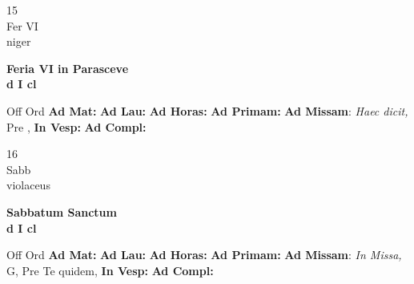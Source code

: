 \documentclass[10pt, openany]{book}
\begin{document}
        \begin{center}
            \begin{minipage}{3.5in}
                \vspace{2em}
                \begin{minipage}{0.5in}
                    {\Huge 15} \\
                    {\normalsize Fer VI} \\
                    {\normalsize niger}
                \end{minipage}
                \begin{minipage}{3.0in}
                    \textbf{ \large Feria VI in Parasceve \\
                    \textnormal{\normalsize d I cl}} \\ 
                \end{minipage}
                \begin{justify}Off Ord
                    \textbf{Ad Mat: }
                    \textbf{Ad Lau: }
                    \textbf{Ad Horas: }
                    \textbf{Ad Primam: }\textbf{Ad Missam}: \textit{Haec dicit,} Pre ,  
                    \textbf{In Vesp: }
                    \textbf{Ad Compl: }
                \end{justify}
            \end{minipage}
        \end{center}
    
        \begin{center}
            \begin{minipage}{3.5in}
                \vspace{2em}
                \begin{minipage}{0.5in}
                    {\Huge 16} \\
                    {\normalsize Sabb} \\
                    {\normalsize violaceus}
                \end{minipage}
                \begin{minipage}{3.0in}
                    \textbf{ \large Sabbatum Sanctum \\
                    \textnormal{\normalsize d I cl}} \\ 
                \end{minipage}
                \begin{justify}Off Ord
                    \textbf{Ad Mat: }
                    \textbf{Ad Lau: }
                    \textbf{Ad Horas: }
                    \textbf{Ad Primam: }\textbf{Ad Missam}: \textit{In Missa,} G, Pre Te quidem,  
                    \textbf{In Vesp: }
                    \textbf{Ad Compl: }
                \end{justify}
            \end{minipage}
        \end{center}
    
\end{document}
